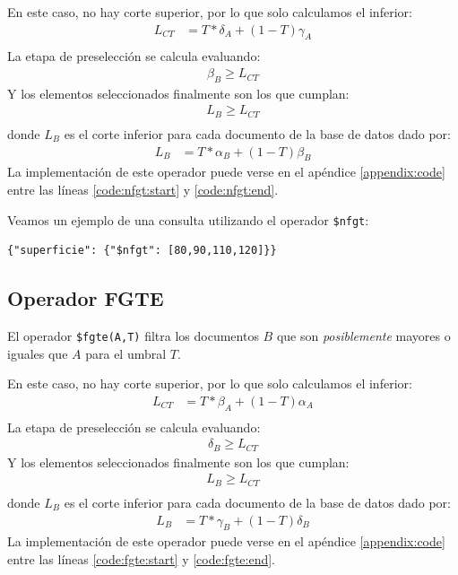 En este caso, no hay corte superior, por lo que solo calculamos el inferior:
%
\begin{align*}
    L_{CT} &= T * \delta_A + (1-T)\gamma_A \\
\end{align*}
%
La etapa de preselección se calcula evaluando:
%
\begin{align*}
    \beta_B \geq L_{CT}
\end{align*}
%
Y los elementos seleccionados finalmente son los que cumplan:
%
\begin{align*}
    L_B \geq L_{CT} \\
\end{align*}
%
donde $L_B$ es el corte inferior para cada documento de la base de datos dado por:
%
\begin{align*}
    L_B &= T * \alpha_B + (1-T)\beta_B
\end{align*}
%
La implementación de este operador puede verse en el apéndice \ref{appendix:code} entre las líneas \ref{code:nfgt:start} y \ref{code:nfgt:end}.

\begin{example}
Veamos un ejemplo de una consulta utilizando el operador \texttt{\$nfgt}:
%
\begin{verbatim}
{"superficie": {"$nfgt": [80,90,110,120]}}
\end{verbatim}

\end{example}

\subsection{Operador FGTE}

El operador \texttt{\$fgte(A,T)} filtra los documentos $B$ que son \textit{posiblemente} mayores o iguales que $A$ para el umbral $T$.

En este caso, no hay corte superior, por lo que solo calculamos el inferior:
%
\begin{align*}
    L_{CT} &= T * \beta_A + (1-T)\alpha_A \\
\end{align*}
%
La etapa de preselección se calcula evaluando:
%
\begin{align*}
    \delta_B \geq L_{CT}
\end{align*}
%
Y los elementos seleccionados finalmente son los que cumplan:
%
\begin{align*}
    L_B \geq L_{CT} \\
\end{align*}
%
donde $L_B$ es el corte inferior para cada documento de la base de datos dado por:
%
\begin{align*}
    L_B &= T * \gamma_B + (1-T)\delta_B
\end{align*}
%
La implementación de este operador puede verse en el apéndice \ref{appendix:code} entre las líneas \ref{code:fgte:start} y \ref{code:fgte:end}.

